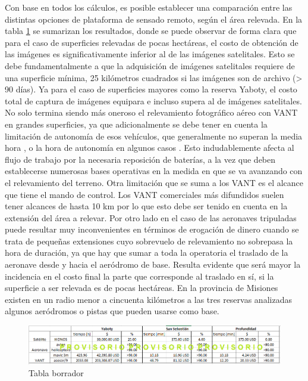 Con base en todos los cálculos, es posible establecer una comparación entre las distintas opciones de plataforma de sensado remoto, según el área relevada.
En la tabla \ref{Tabla_borrador} se sumarizan los resultados, donde se puede observar de forma clara que para el caso de superficies relevadas de pocas hectáreas, el costo de obtención de las imágenes es significativamente inferior al de las imágenes satelitales. Esto se debe fundamentalmente a que la adquisición de imágenes satelitales requiere de una superficie mínima, 25 kilómetros cuadrados si las imágenes son de archivo (> 90 días)\cite{noauthor_satellite_2020}. Ya para el caso de superficies mayores como la reserva Yaboty, el costo total de captura de imágenes equipara e incluso supera al de imágenes satelitales. No solo termina siendo más oneroso el relevamiento fotográfico aéreo con VANT en grandes superficies, ya que adicionalmente se debe tener en cuenta la limitación de autonomía de esos vehículos, que generalmente no superan la media hora \cite{}, o la hora de autonomía en algunos casos \cite{}. Esto indudablemente afecta al flujo de trabajo por la necesaria reposición de baterías, a la vez que deben establecerse numerosas bases operativas en la medida en que se va avanzando con el relevamiento del terreno. Otra limitación que se suma a los VANT es el alcance que tiene el mando de control. Los VANT comerciales más difundidos suelen tener alcances de hasta 10 km \cite{} por lo que esto debe ser tenido en cuenta en la extensión del área a relevar. Por otro lado en el caso de las aeronaves tripuladas puede resultar muy inconvenientes en términos de erogación de dinero cuando se trata de pequeñas extensiones cuyo sobrevuelo de relevamiento no sobrepasa la hora de duración, ya que hay que sumar a toda la operatoria el traslado de la aeronave desde y hacia el aeródromo de base. Resulta evidente que será mayor la incidencia en el costo final la parte que corresponde al traslado en sí, si la superficie a ser relevada es de pocas hectáreas. En la provincia de Misiones existen en un radio menor a cincuenta kilómetros a las tres reservas analizadas algunos aeródromos o pistas que pueden usarse como base.
\begin{figure}
    \includegraphics[width=\textwidth]{Imagenes/Tabla comparativa borrador.png}
     \hfill
     \caption{Tabla borrador}
        \label{Tabla_borrador}
\end{figure}
